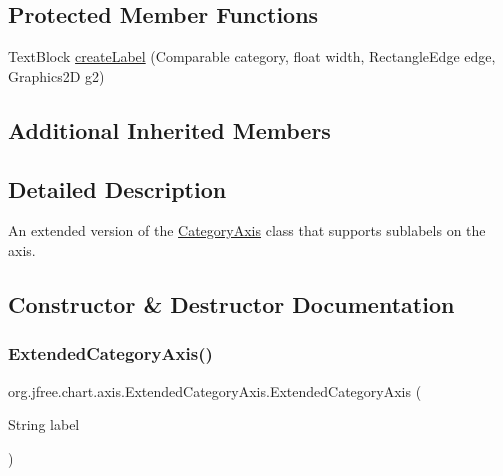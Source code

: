 \subsection*{Protected Member Functions}
\begin{DoxyCompactItemize}
\item 
Text\+Block \mbox{\hyperlink{classorg_1_1jfree_1_1chart_1_1axis_1_1_extended_category_axis_acd739d05fbbfe74ea16f241eca8170f9}{create\+Label}} (Comparable category, float width, Rectangle\+Edge edge, Graphics2D g2)
\end{DoxyCompactItemize}
\subsection*{Additional Inherited Members}


\subsection{Detailed Description}
An extended version of the \mbox{\hyperlink{classorg_1_1jfree_1_1chart_1_1axis_1_1_category_axis}{Category\+Axis}} class that supports sublabels on the axis. 

\subsection{Constructor \& Destructor Documentation}
\mbox{\label{classorg_1_1jfree_1_1chart_1_1axis_1_1_extended_category_axis_af014a2dfcf9d4c529d7bd6e07b0bfdd0}} 
\subsubsection{\texorpdfstring{Extended\+Category\+Axis()}{ExtendedCategoryAxis()}}
{\footnotesize\ttfamily org.\+jfree.\+chart.\+axis.\+Extended\+Category\+Axis.\+Extended\+Category\+Axis (\begin{DoxyParamCaption}\item[{String}]{label }\end{DoxyParamCaption})}

